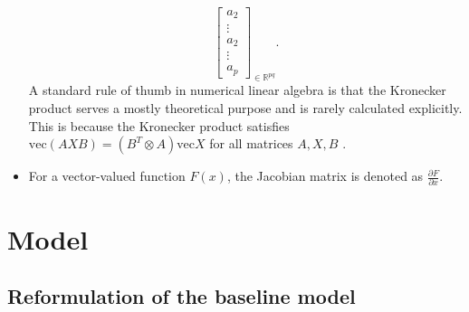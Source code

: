 \documentclass{article}
\begin{document}
\begin{itemize}
$${\begin{bmatrix}
            a_2 \\
            \vdots \\
            a_2 \\
            \vdots \\
            a_p
        \end{bmatrix}
        }_{\in \mathbb{R}^{pq}}
        .$$
        A standard rule of thumb in numerical linear algebra is that the Kronecker product serves a mostly theoretical purpose and is rarely calculated explicitly.
        This is because the Kronecker product satisfies $\mathrm{vec} (AXB) = (B^T \otimes A) \mathrm{vec} X$ for all matrices $A,X,B$ \cite[eq. 1.3.6]{Golub2013}.
    \item For a vector-valued function $F(x)$, the Jacobian matrix is denoted as $\frac{\partial F}{\partial x}$.
\end{itemize}

\section{Model}
\label{sec: model}

\subsection{Reformulation of the baseline model}
\end{document}
